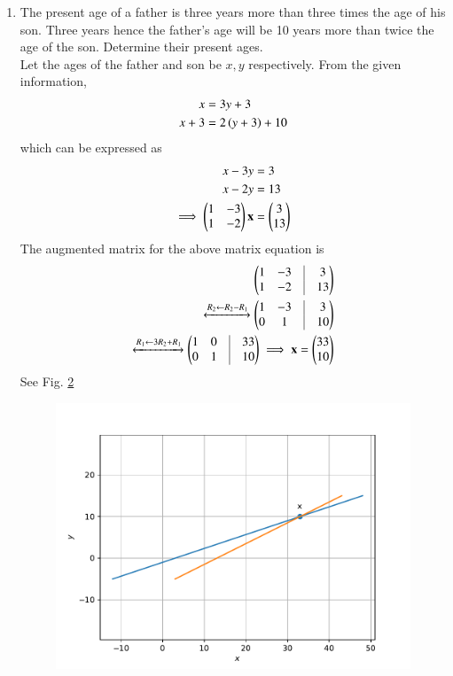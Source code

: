 \documentclass[journal,12pt,twocolumn]{IEEEtran}
\renewcommand\thesection{\arabic{section}}
\begin{document}
\begin{enumerate}[label=\thesection.\arabic*.,ref=\thesection.\theenumi]
\begin{figure}
	  \caption{}
	  \label{fig:matrix-10-7.pdf}
	  \end{figure}
        \item The present age of a father is three years more than three times the age of his son. Three years hence the father's age will be 10 years more than twice the age of the son. Determine their present ages.\\
		\solution Let the ages of the father and son be $x, y$ respectively.  From the given information, 
		    \begin{align}
			    x &= 3y+3
			    \\
			    x+3 &= 2\left(y+3\right) + 10
		    \end{align}
		    which can be expressed as 
		    \begin{align}
			    x  -3y &= 3
			    \\
			    x -2y  &= 13
			    \\
			    \implies 
			    \begin{pmatrix}1 &  -3
			    \\
			    1 & -2\end{pmatrix}\mathbf{x} &= \begin{pmatrix}3 \\ 13\end{pmatrix}
		    \end{align}
		    The augmented matrix for the above matrix equation is 
		    \begin{align}
			    \myvec{
				    1 & -3 & \vrule & 3
			    \\
			    1 & -2  &\vrule & 13
		    }
		    \\
		    \xleftrightarrow[]{R_2 \leftarrow R_2 -R_1 }
			    \myvec{
				    1 & -3 & \vrule & 3
			    \\
			    0 & 1  &\vrule & 10
		    }
		    \\
		    \xleftrightarrow[]{R_1 \leftarrow 3R_2 +R_1 }
			    \myvec{
				    1 & 0 & \vrule & 33
			    \\
			    0 & 1  &\vrule & 10
		    }
			    \implies \vec{x} = \myvec{33 \\ 10}
		    \end{align}
    See Fig. 
	  \ref{fig:matrix-10-8.pdf}
  \begin{figure}
	  \centering 
	  \includegraphics[width=\columnwidth]{figs/matrix-10-8.pdf}
	  \caption{}
	  \label{fig:matrix-10-8.pdf}
	  \end{figure}


\end{enumerate}
\end{document}
